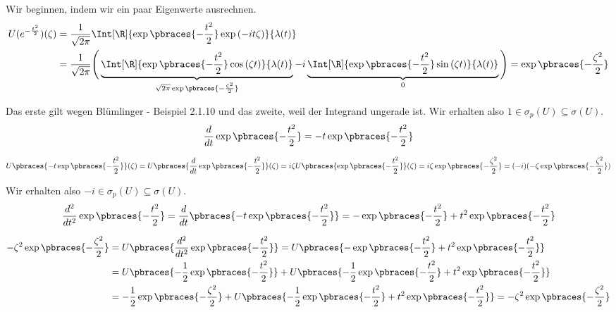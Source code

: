 \begin{solution}

Wir beginnen, indem wir ein paar Eigenwerte ausrechnen.
\begin{align*}
  U(e^{-\frac{t^2}{2}})(\zeta)
  & =
  \frac{1}{\sqrt{2 \pi}}
  \Int[\R]
  {
    \exp \pbraces{-\frac{t^2}{2}}
    \exp{(-i t \zeta)}
  }
  {\lambda(t)} \\
  & =
  \frac{1}{\sqrt{2 \pi}}
  \Bigg (
    \underbrace
    {
    \Int[\R]
    {
    \exp \pbraces{-\frac{t^2}{2}}
    \cos{(\zeta t)}
    }
    {\lambda(t)}
    }_{
    \sqrt{2 \pi}
    \exp \pbraces{-\frac{\zeta^2}{2}}
    } -
    i
    \underbrace
    {
    \Int[\R]
    {
    \exp \pbraces{-\frac{t^2}{2}}
    \sin{(\zeta t)}
    }
    {\lambda(t)}
    }_0
  \Bigg )
  =
  \exp \pbraces{-\frac{\zeta^2}{2}}
\end{align*}

Das erste  gilt wegen Blümlinger - Beispiel 2.1.10 und das zweite, weil der Integrand ungerade ist.
Wir erhalten also $1 \in \sigma_p(U) \subseteq \sigma(U)$. \\

\FloatBarrier
\begin{align*}
  \frac{d}{dt}
  \exp \pbraces{-\frac{t^2}{2}}
  =
  -t \exp \pbraces{-\frac{t^2}{2}}
\end{align*}



\begin{align*}
  U \pbraces{-t \exp \pbraces{-\frac{t^2}{2}}}(\zeta)
  =
  U \pbraces{\frac{d}{dt} \exp \pbraces{-\frac{t^2}{2}}}(\zeta)
  =
  i \zeta U \pbraces{\exp \pbraces{-\frac{t^2}{2}}}(\zeta)
  =
  i \zeta \exp \pbraces{-\frac{\zeta^2}{2}}
  =
  (-i) (-\zeta \exp \pbraces{-\frac{\zeta^2}{2}})
\end{align*}

Wir erhalten also $-i \in \sigma_p(U) \subseteq \sigma(U)$. \\

\begin{align*}
  \frac{d^2}{dt^2}
  \exp \pbraces{-\frac{t^2}{2}}
  =
  \frac{d}{dt}
  \pbraces{-t \exp \pbraces{-\frac{t^2}{2}}}
  =
  -\exp \pbraces{-\frac{t^2}{2}} +
  t^2 \exp \pbraces{-\frac{t^2}{2}}
\end{align*}

\begin{align*}
  -\zeta^2 \exp \pbraces{-\frac{\zeta^2}{2}}
  & =
  U \pbraces
  {
    \frac{d^2}{dt^2}
    \exp \pbraces{-\frac{t^2}{2}}
  }
  =
  U \pbraces
  {
    -\exp \pbraces{-\frac{t^2}{2}} +
    t^2 \exp \pbraces{-\frac{t^2}{2}}
  } \\
  & =
  U \pbraces
  {
    -\frac{1}{2}
    \exp \pbraces{-\frac{t^2}{2}}
  } +
  U \pbraces
  {
    -\frac{1}{2}
    \exp \pbraces{-\frac{t^2}{2}} +
    t^2 \exp \pbraces{-\frac{t^2}{2}}
  } \\
  & =
  -\frac{1}{2} \exp \pbraces{-\frac{\zeta^2}{2}} +
  U \pbraces
  {
    -\frac{1}{2}
    \exp \pbraces{-\frac{t^2}{2}} +
    t^2 \exp \pbraces{-\frac{t^2}{2}}
  }
  =
  -\zeta^2 \exp \pbraces{-\frac{\zeta^2}{2}}
\end{align*}


\end{solution}
